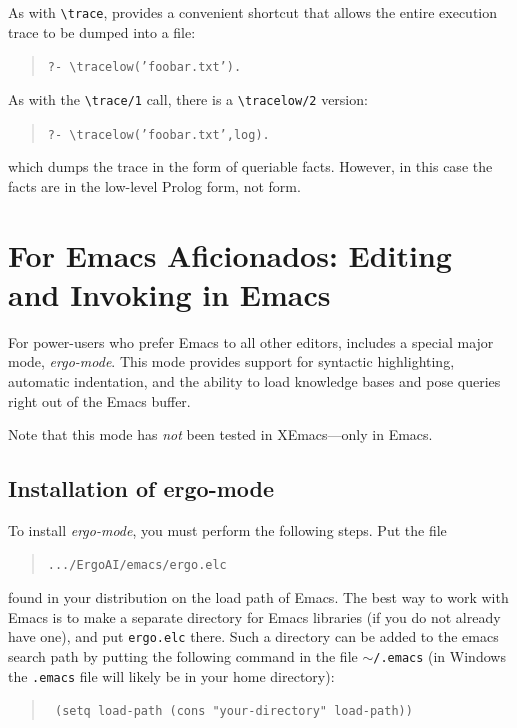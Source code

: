 \documentclass[11pt]{article}
\newcommand{\ERGO}{\mbox{\smaller{\ensuremath{\cal{E}}\smaller{{\sc{RGO}}}}}\xspace}
\newcommand{\FLSYSTEM}{\ERGO}
\newcommand{\ERGOMODE}{ergo-mode}
\newcommand{\ERGOFILE}{ergo.elc}
\newcommand{\bs}{\textbackslash}
\begin{document}
As with {\tt \bs{}trace}, \FLSYSTEM provides a convenient shortcut that allows
the entire execution trace to be dumped into a file:
\begin{quote}
 \tt     ?- \bs{}tracelow('foobar.txt').  
\end{quote}

As with the \texttt{\bs{}trace/1} call, there is a \texttt{\bs{}tracelow/2}   
version:
\begin{quote}
 \tt     ?- \bs{}tracelow('foobar.txt',log).  
\end{quote}
which dumps the trace in the form of queriable facts. However, in this case
the facts are in the low-level Prolog form, not \FLSYSTEM form.


\newpage
\section{For Emacs Aficionados: Editing and Invoking \FLSYSTEM in Emacs}

For power-users who prefer Emacs to all other editors, \FLSYSTEM includes a
special major mode, \emph{\ERGOMODE}.
This mode provides support for syntactic
highlighting, automatic indentation, and the ability to load knowledge
bases and pose \FLSYSTEM
queries right out of the Emacs buffer.

\noindent
Note that this mode has \emph{not} been tested in XEmacs---only in Emacs.


\subsection{Installation of ergo-mode}


To install \emph{\ERGOMODE}, you must perform the following steps. Put the
file
\begin{quote}
  {\tt .../ErgoAI/emacs/\ERGOFILE}
\end{quote}
found in your \FLSYSTEM distribution on the load path of Emacs.
The best way to work with Emacs is to make a
separate directory for Emacs libraries (if you do not already have one), and put
\texttt{\ERGOFILE}  there. Such a directory can be added to the emacs search path by
putting the following command in the file
\texttt{\ensuremath{\sim}/.emacs} (in Windows the \texttt{.emacs}
file will likely be in your home directory):
\begin{quote}
  \tt
   (setq load-path (cons "your-directory" load-path)) 
\end{quote}
\end{document}
